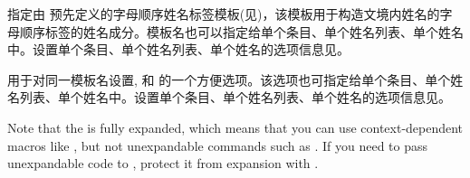 \begin{ltxsyntax}
\begin{optionlist*}

指定由  预先定义的字母顺序姓名标签模板(见)，该模板用于构造文境内姓名的字母顺序标签的姓名成分。模板名也可以指定给单个条目、单个姓名列表、单个姓名中。设置单个条目、单个姓名列表、单个姓名的选项信息见。


用于对同一模板名设置,  和 的一个方便选项。该选项也可指定给单个条目、单个姓名列表、单个姓名中。设置单个条目、单个姓名列表、单个姓名的选项信息见。



Note that the  is fully expanded, which means that you can use context-dependent macros like , but not unexpandable commands such as . If you need to pass unexpandable code to , protect it from expansion with .


\end{optionlist*}
\end{ltxsyntax}
